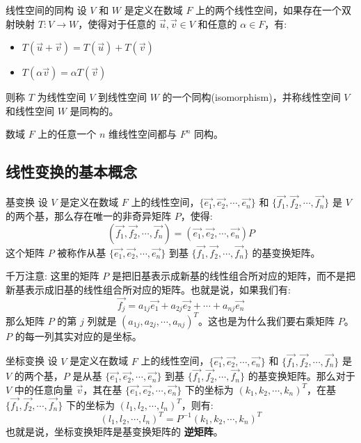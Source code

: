 \documentclass[a4paper,12pt]{ctexart}
\begin{document}
    \begin{mydef}{线性空间的同构}{}
    设 $V$ 和 $W$ 是定义在数域 $F$ 上的两个线性空间，如果存在一个双射映射 $T: V \to W$，使得对于任意的 $\vec{u}, \vec{v} \in V$ 和任意的 $\alpha \in F$，有:
    \begin{itemize}
        \item $T(\vec{u} + \vec{v}) = T(\vec{u}) + T(\vec{v})$
        \item $T(\alpha \vec{v}) = \alpha T(\vec{v})$
    \end{itemize}
    则称 $T$ 为线性空间 $V$ 到线性空间 $W$ 的一个同构(isomorphism)，并称线性空间 $V$ 和线性空间 $W$ 是同构的。
    \end{mydef}
    
    \begin{mythm}{}{}
        数域 $F$ 上的任意一个 $n$ 维线性空间都与 $F^n$ 同构。
    \end{mythm}

\subsection{线性变换的基本概念}

    \begin{mythm}{基变换}{}
    设 $V$ 是定义在数域 $F$ 上的线性空间，$\{\vec{e_1}, \vec{e_2}, \cdots, \vec{e_n}\}$ 和 $\{\vec{f_1}, \vec{f_2}, \cdots, \vec{f_n}\}$ 是 $V$ 的两个基，那么存在唯一的非奇异矩阵 $P$，使得:
    \[
    (\vec{f_1}, \vec{f_2}, \cdots, \vec{f_n}) = (\vec{e_1}, \vec{e_2}, \cdots, \vec{e_n}) P
    \]
    这个矩阵 $P$ 被称作从基 $\{\vec{e_1}, \vec{e_2}, \cdots, \vec{e_n}\}$ 到基 $\{\vec{f_1}, \vec{f_2}, \cdots, \vec{f_n}\}$ 的基变换矩阵。
    \end{mythm}
    
    \begin{mynote}
    千万注意: 这里的矩阵 $P$ 是把旧基表示成新基的线性组合所对应的矩阵，而不是把新基表示成旧基的线性组合所对应的矩阵。也就是说，如果我们有:
    \[
    \vec{f_j} = a_{1j} \vec{e_1} + a_{2j} \vec{e_2} + \cdots + a_{nj} \vec{e_n}
    \]
    那么矩阵 $P$ 的第 $j$ 列就是 $(a_{1j}, a_{2j}, \cdots, a_{nj})^T$。这也是为什么我们要右乘矩阵 $P$。$P$ 的每一列其实对应的是坐标。
    \end{mynote}

\newpage
    
    \begin{mythm}{坐标变换}{}
    设 $V$ 是定义在数域 $F$ 上的线性空间，$\{\vec{e_1}, \vec{e_2}, \cdots, \vec{e_n}\}$ 和 $\{\vec{f_1}, \vec{f_2}, \cdots, \vec{f_n}\}$ 是 $V$ 的两个基，$P$ 是从基 $\{\vec{e_1}, \vec{e_2}, \cdots, \vec{e_n}\}$ 到基 $\{\vec{f_1}, \vec{f_2}, \cdots, \vec{f_n}\}$ 的基变换矩阵。那么对于 $V$ 中的任意向量 $\vec{v}$，其在基 $\{\vec{e_1}, \vec{e_2}, \cdots, \vec{e_n}\}$ 下的坐标为 $(k_1, k_2, \cdots, k_n)^T$，在基 $\{\vec{f_1}, \vec{f_2}, \cdots, \vec{f_n}\}$ 下的坐标为 $(l_1, l_2, \cdots, l_n)^T$，则有:
    \[
    (l_1, l_2, \cdots, l_n)^T = P^{-1} (k_1, k_2, \cdots, k_n)^T
    \]
    也就是说，坐标变换矩阵是基变换矩阵的 \textbf{逆矩阵}。
    \end{mythm}
    
\end{document}
